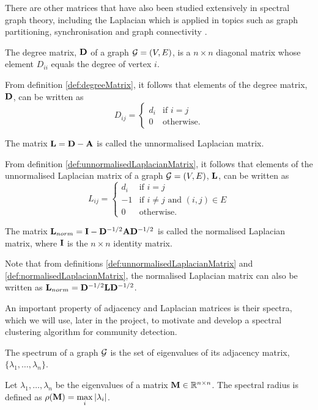 There are other matrices that have also been studied extensively in spectral graph theory, including the Laplacian which is applied in topics such as graph partitioning, synchronisation and graph connectivity \cite{For10}.
\begin{definition}
	\label{def:degreeMatrix}
	The degree matrix, $\mathbf D$ of a graph $\mathcal G = (V,E)$, is a $n \times n$ diagonal matrix whose element $D_{ii}$ equals the degree of vertex $i$.
\end{definition}
From definition \ref{def:degreeMatrix}, it follows that elements of the degree matrix, $\mathbf D$, can be written as
\begin{equation*}
	 D_{ij} =
	\begin{cases}
		d_{i} & \text{if } i = j\\
		0 & \text{otherwise}.
	\end{cases}
\end{equation*}
\begin{definition}
	\label{def:unnormalisedLaplacianMatrix}
	The matrix $\mathbf L = \mathbf D  - \mathbf A $ is called the unnormalised Laplacian matrix.
\end{definition}
From definition \ref{def:unnormalisedLaplacianMatrix}, it follows that elements of the unnormalised Laplacian matrix of a graph $\mathcal G = (V,E)$, $\mathbf L$, can be written as
\begin{equation*}
	L_{ij} =
	\begin{cases}
		d_{i} & \text{if } i = j\\
		-1 & \text{if } i \neq j \text{ and }  (i,j) \in E\\
		0 & \text{otherwise}.
	\end{cases}
\end{equation*}
\begin{definition}
	\label{def:normalisedLaplacianMatrix}
	The matrix $\mathbf L_{norm} = \mathbf I  - \mathbf D^{-1/2}\mathbf A\mathbf D^{-1/2}$ is called the normalised Laplacian matrix, where $\mathbf I$ is the $n \times n$ identity matrix.
\end{definition}
Note that from definitions \ref{def:unnormalisedLaplacianMatrix} and \ref{def:normalisedLaplacianMatrix}, the normalised Laplacian matrix can also be written as $\mathbf L_{norm} = \mathbf D^{-1/2}\mathbf L\mathbf D^{-1/2}$.

An important property of adjacency and Laplacian matrices is their spectra, which we will use, later in the project, to motivate and develop a spectral clustering algorithm for community detection.
\begin{definition}
	\label{def:spectrum}
	The spectrum of a graph $\mathcal G$ is the set of eigenvalues of its adjacency matrix, $\{\lambda_{1},\dots,\lambda_{n}\}$.
\end{definition}
\begin{definition}
	\label{def:spectralRadius}
	Let $\lambda_{1},\dots,\lambda_{n}$ be the eigenvalues of a matrix $\mathbf M \in \mathbb{R}^{n \times n}$. The spectral radius is defined as $\rho(\mathbf M) = \max\limits_{i} \left\vert\lambda_{i}\right\vert$.
\end{definition}


